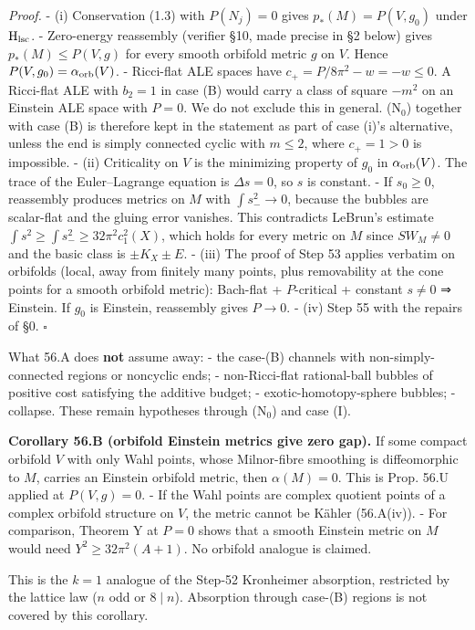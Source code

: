 \documentclass[
  10pt,
]{report}
\begin{document}
\emph{Proof.} - (i) Conservation (1.3) with \(P(N_j)=0\) gives
\(p_*(M)=P(V,g_0)\) under \(\mathrm H_{\rm lsc}\). - Zero-energy
reassembly (verifier §10, made precise in §2 below) gives
\(p_*(M)\le P(V,g)\) for every smooth orbifold metric \(g\) on \(V\).
Hence \(P(V,g_0)=\alpha_{\rm orb}(V)\). - Ricci-flat ALE spaces have
\(c_+=P/8\pi^2-w=-w\le0\). A Ricci-flat ALE with \(b_2=1\) in case (B)
would carry a class of square \(-m^2\) on an Einstein ALE space with
\(P=0\). We do not exclude this in general. (N\(_0\)) together with case
(B) is therefore kept in the statement as part of case (i)'s
alternative, unless the end is simply connected cyclic with \(m\le2\),
where \(c_+=1>0\) is impossible. - (ii) Criticality on \(V\) is the
minimizing property of \(g_0\) in \(\alpha_{\rm orb}(V)\). The trace of
the Euler--Lagrange equation is \(\Delta s=0\), so \(s\) is constant. -
If \(s_0\ge0\), reassembly produces metrics on \(M\) with
\(\int s_-^2\to0\), because the bubbles are scalar-flat and the gluing
error vanishes. This contradicts LeBrun's estimate
\(\int s^2\ge\int s_-^2\ge32\pi^2c_1^2(X)\), which holds for every
metric on \(M\) since \(SW_M\ne0\) and the basic class is
\(\pm K_X\pm E\). - (iii) The proof of Step 53 applies verbatim on
orbifolds (local, away from finitely many points, plus removability at
the cone points for a smooth orbifold metric): Bach-flat +
\(P\)-critical + constant \(s\ne0\) ⇒ Einstein. If \(g_0\) is Einstein,
reassembly gives \(P\to0\). - (iv) Step 55 with the repairs of §0.
\(\square\)

What 56.A does \textbf{not} assume away: - the case-(B) channels with
non-simply-connected regions or noncyclic ends; - non-Ricci-flat
rational-ball bubbles of positive cost satisfying the additive budget; -
exotic-homotopy-sphere bubbles; - collapse. These remain hypotheses
through (N\(_0\)) and case (I).

\textbf{Corollary 56.B (orbifold Einstein metrics give zero gap).} If
some compact orbifold \(V\) with only Wahl points, whose Milnor-fibre
smoothing is diffeomorphic to \(M\), carries an Einstein orbifold
metric, then \(\alpha(M)=0\). This is Prop. 56.U applied at
\(P(V,g)=0\). - If the Wahl points are complex quotient points of a
complex orbifold structure on \(V\), the metric cannot be Kähler
(56.A(iv)). - For comparison, Theorem Y at \(P=0\) shows that a smooth
Einstein metric on \(M\) would need \(Y^2\ge32\pi^2(A+1)\). No orbifold
analogue is claimed.

This is the \(k=1\) analogue of the Step-52 Kronheimer absorption,
restricted by the lattice law (\(n\) odd or \(8\mid n\)). Absorption
through case-(B) regions is not covered by this corollary.
\end{document}
